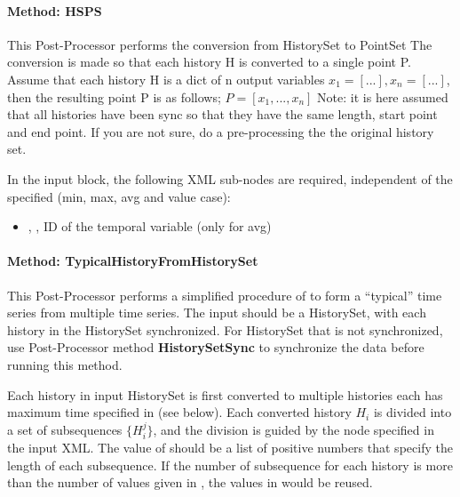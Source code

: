 \paragraph{Method: HSPS}

This Post-Processor performs the conversion from HistorySet to PointSet
The conversion is made so that each history H is converted to a single point P.
Assume that each history H is a dict of n output variables $x_1=[...],x_n=[...]$, then the resulting point P is as follows; $P=[x_1,...,x_n]$
Note: it is here assumed that all histories have been sync so that they have the same length, start point and end point. If you are not sure, do a pre-processing the the original history set.

In the  input block, the following XML sub-nodes are required,
independent of the  specified (min, max, avg and value case):

\begin{itemize}
   \item {}, , ID of the temporal variable (only for avg)
\end{itemize}

\paragraph{Method: TypicalHistoryFromHistorySet}
This Post-Processor performs a simplified procedure of \cite{wilcox2008users} to form a ``typical'' time series from multiple time series. The input should be a HistorySet, with each history in the HistorySet synchronized. For HistorySet that is not synchronized, use Post-Processor method \textbf{HistorySetSync}  to synchronize the data before running this method.

Each history in input HistorySet is first converted to multiple histories each has maximum time specified in  (see below). Each converted history $H_i$ is divided into a set of subsequences $\{H_i^j\}$, and the division is guided by the  node specified in the input XML. The value of  should be a list of positive numbers that specify the length of each subsequence. If the number of subsequence for each history is more than the number of values given in , the values in  would be reused.

